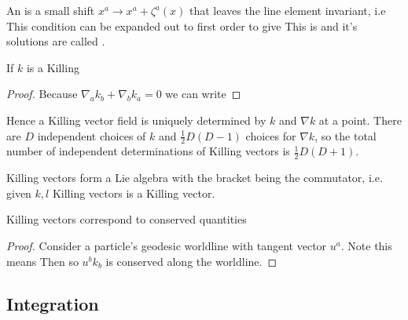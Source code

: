 \documentclass{article}
\begin{document}
\begin{definition}
An  is a small shift $x^a \to x^a + \zeta^a(x)$ that leaves the line element invariant, i.e
This condition can be expanded out to first order to give 
This is  and it's solutions are called .
\end{definition}

\begin{lemma}
If $k$ is a Killing 
\begin{proof}
	Because $\nabla_a k_b +\nabla_b k_a = 0$ we can write 
\end{proof}
Hence a Killing vector field is uniquely determined by $k$ and $\nabla k$ at a point. There are $D$ independent choices of $k$ and $\frac{1}{2}D(D-1)$ choices for $\nabla k$, so the total number of independent determinations of Killing vectors is $\frac{1}{2}D(D+1)$. 
\end{lemma}

\begin{lemma}
Killing vectors form a Lie algebra with the bracket being the commutator, i.e. given $k,l$ Killing vectors
is a Killing vector. 
\end{lemma}

\begin{lemma}
Killing vectors correspond to conserved quantities
\end{lemma}
\begin{proof}
Consider a particle's geodesic worldline with tangent vector $u^a$. Note this means 
Then 
so $u^b k_b$ is conserved along the worldline. 
\end{proof}
\subsection{Integration}
\end{document}
